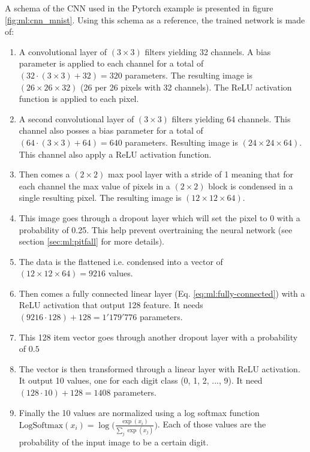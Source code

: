 \documentclass[../main.tex]{subfiles}
\begin{document}
A schema of the CNN used in the Pytorch example is presented in figure \ref{fig:ml:cnn_mnist}. Using this schema as a reference, the trained network is made of:
\begin{enumerate}
  \item A convolutional layer of $(3 \times 3)$ filters yielding 32 channels. A bias parameter is applied to each channel for a total of $(32 \cdot (3\times3) + 32) = 320$ parameters. The resulting image is $(26\times26 \times 32)$ (26 per 26 pixels with 32 channels). The ReLU activation function is applied to each pixel.
  \item A second convolutional layer of $(3 \times 3)$ filters yielding 64 channels. This channel also posses a bias parameter for a total of $(64 \cdot (3\times3) + 64) = 640$ parameters. Resulting image is $(24\times24\times64)$. This channel also apply a ReLU activation function.
  \item Then comes a $(2\times2)$ max pool layer with a stride of 1 meaning that for each channel the max value of pixels in a $(2\times2)$ block is condensed in a single resulting pixel. The resulting image is $(12 \times 12 \times 64)$.
  \item This image goes through a dropout layer which will set the pixel to 0 with a probability of 0.25. This help prevent overtraining the neural network (see section \ref{sec:ml:pitfall} for more details).
  \item The data is the flattened i.e. condensed into a vector of $(12 \times 12 \times 64) = 9216$ values.
  \item Then comes a fully connected linear layer (Eq. \ref{eq:ml:fully-connected}) with a ReLU activation that output 128 feature. It needs $(9216 \cdot 128)+ 128 = 1'179'776$ parameters.
  \item This 128 item vector goes through another dropout layer with a probability of $0.5$
  \item The vector is then transformed through a linear layer with ReLU activation. It output 10 values, one for each digit class (0, 1, 2, ..., 9). It need $(128 \cdot 10) + 128 = 1408$ parameters.
  \item Finally the 10 values are normalized using a log softmax function $\mathrm{LogSoftmax}(x_i) = \log \bigg(\frac{\exp(x_i)}{\sum_j \exp(x_j)}\bigg)$. Each of those values are the probability of the input image to be a certain digit.
\end{enumerate}
\end{document}

